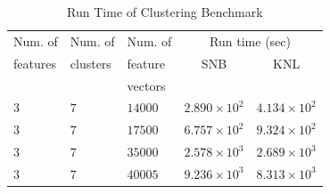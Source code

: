 \begin{table}
  \caption{Run Time of Clustering Benchmark}
  \label{tab:clusterResults}
  \begin{tabular}{lllcc}
    \toprule
    Num. of   & Num. of   & Num. of & \multicolumn{2}{c}{Run time (sec)}\\
    features  & clusters  & feature           & SNB & KNL\\
              &           & vectors           & &\\
    \midrule
    $3$ & $7$ & $14000$ & $2.890\times 10^{2}$ & $4.134\times 10^{2}$ \\ %
    $3$ & $7$ & $17500$ & $6.757\times 10^{2}$ & $9.324\times 10^{2}$ \\ %
    $3$ & $7$ & $35000$ & $2.578\times 10^{3}$ & $2.689\times 10^{3}$ \\ %
    $3$ & $7$ & $40005$ & $9.236\times 10^{3}$ & $8.313\times 10^{3}$ \\ %
    \bottomrule
  \end{tabular}
\end{table}


